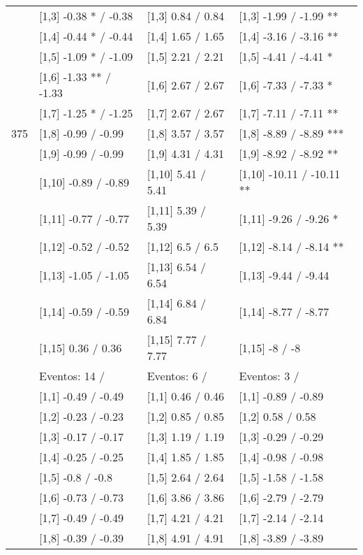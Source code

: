 \begin{table}
\begin{tabular}[t]{llll}
 & {}[1,3] -0.38 * / -0.38 & {}[1,3] 0.84  / 0.84 & {}[1,3] -1.99  / -1.99 **\\
\addlinespace
 & {}[1,4] -0.44 * / -0.44 & {}[1,4] 1.65  / 1.65 & {}[1,4] -3.16  / -3.16 **\\
 & {}[1,5] -1.09 * / -1.09 & {}[1,5] 2.21  / 2.21 & {}[1,5] -4.41  / -4.41 *\\
 & {}[1,6] -1.33 ** / -1.33 & {}[1,6] 2.67  / 2.67 & {}[1,6] -7.33  / -7.33 *\\
 & {}[1,7] -1.25 * / -1.25 & {}[1,7] 2.67  / 2.67 & {}[1,7] -7.11  / -7.11 **\\
375 & {}[1,8] -0.99  / -0.99 & {}[1,8] 3.57  / 3.57 & {}[1,8] -8.89  / -8.89 ***\\
\addlinespace
 & {}[1,9] -0.99  / -0.99 & {}[1,9] 4.31  / 4.31 & {}[1,9] -8.92  / -8.92 **\\
 & {}[1,10] -0.89  / -0.89 & {}[1,10] 5.41  / 5.41 & {}[1,10] -10.11  / -10.11 **\\
 & {}[1,11] -0.77  / -0.77 & {}[1,11] 5.39  / 5.39 & {}[1,11] -9.26  / -9.26 *\\
 & {}[1,12] -0.52  / -0.52 & {}[1,12] 6.5  / 6.5 & {}[1,12] -8.14  / -8.14 **\\
 & {}[1,13] -1.05  / -1.05 & {}[1,13] 6.54  / 6.54 & {}[1,13] -9.44  / -9.44\\
\addlinespace
 & {}[1,14] -0.59  / -0.59 & {}[1,14] 6.84  / 6.84 & {}[1,14] -8.77  / -8.77\\
 & {}[1,15] 0.36  / 0.36 & {}[1,15] 7.77  / 7.77 & {}[1,15] -8  / -8\\
 & Eventos:  14 / & Eventos:  6 / & Eventos:  3 /\\
 & {}[1,1] -0.49  / -0.49 & {}[1,1] 0.46  / 0.46 & {}[1,1] -0.89  / -0.89\\
 & {}[1,2] -0.23  / -0.23 & {}[1,2] 0.85  / 0.85 & {}[1,2] 0.58  / 0.58\\
\addlinespace
 & {}[1,3] -0.17  / -0.17 & {}[1,3] 1.19  / 1.19 & {}[1,3] -0.29  / -0.29\\
 & {}[1,4] -0.25  / -0.25 & {}[1,4] 1.85  / 1.85 & {}[1,4] -0.98  / -0.98\\
 & {}[1,5] -0.8  / -0.8 & {}[1,5] 2.64  / 2.64 & {}[1,5] -1.58  / -1.58\\
 & {}[1,6] -0.73  / -0.73 & {}[1,6] 3.86  / 3.86 & {}[1,6] -2.79  / -2.79\\
 & {}[1,7] -0.49  / -0.49 & {}[1,7] 4.21  / 4.21 & {}[1,7] -2.14  / -2.14\\
\addlinespace
500 & {}[1,8] -0.39  / -0.39 & {}[1,8] 4.91  / 4.91 & {}[1,8] -3.89  / -3.89\\

\end{tabular}
\end{table}
